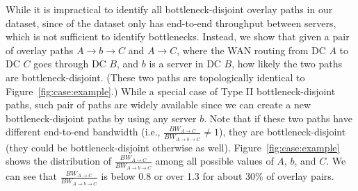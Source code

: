While it is impractical to identify all bottleneck-disjoint overlay paths
in our dataset, since of the dataset only has end-to-end throughput between
servers, which is not sufficient to identify bottlenecks.
Instead, we show that given a pair of overlay
paths $A$$\rightarrow$$b\rightarrow$$C$ and $A$$\rightarrow$$C$,
where the WAN routing from DC $A$ to DC $C$ goes through DC $B$,
and $b$ is a server in DC $B$, how likely the two paths are 
bottleneck-disjoint.
(These two paths are topologically identical to 
Figure~\ref{fig:case:example}.)
While a special case of Type II bottleneck-disjoint paths, 
such pair of paths are widely available since we can
create a new bottleneck-disjoint paths by using any server $b$.
Note that if these two paths have different end-to-end bandwidth
(i.e., $\frac{BW_{A\rightarrow C}}{BW_{A\rightarrow b\rightarrow C}}\neq1$),
they are bottleneck-disjoint (they could be bottleneck-disjoint 
otherwise as well).
Figure~\ref{fig:case:example} shows the distribution of
$\frac{BW_{A\rightarrow C}}{BW_{A\rightarrow b\rightarrow C}}$ 
among all possible values of $A$, $b$, and $C$.
We can see that $\frac{BW_{A\rightarrow C}}{BW_{A\rightarrow b\rightarrow C}}$ is
below 0.8 or over 1.3 for about 30\% of overlay pairs.




